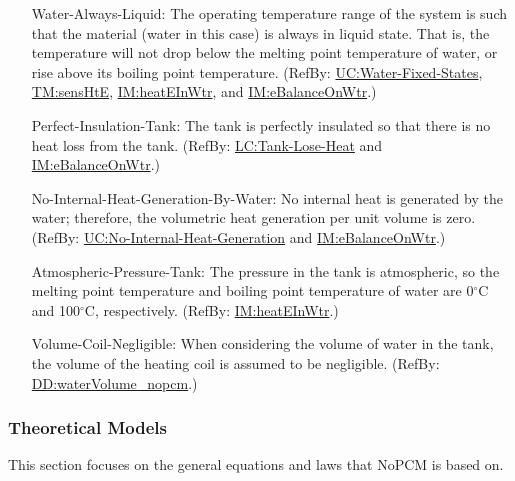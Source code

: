 \documentclass[12pt]{article}
\begin{document}
\begin{itemize}
\item[Water-Always-Liquid:\phantomsection\label{assumpWAL}]{The operating temperature range of the system is such that the material (water in this case) is always in liquid state. That is, the temperature will not drop below the melting point temperature of water, or rise above its boiling point temperature. (RefBy: \hyperref[unlikeChgWFS]{UC:Water-Fixed-States}, \hyperref[TM:sensHtE]{TM:sensHtE}, \hyperref[IM:heatEInWtr]{IM:heatEInWtr}, and \hyperref[IM:eBalanceOnWtr]{IM:eBalanceOnWtr}.)}
\item[Perfect-Insulation-Tank:\phantomsection\label{assumpPIT}]{The tank is perfectly insulated so that there is no heat loss from the tank. (RefBy: \hyperref[likeChgTLH]{LC:Tank-Lose-Heat} and \hyperref[IM:eBalanceOnWtr]{IM:eBalanceOnWtr}.)}
\item[No-Internal-Heat-Generation-By-Water:\phantomsection\label{assumpNIHGBW}]{No internal heat is generated by the water; therefore, the volumetric heat generation per unit volume is zero. (RefBy: \hyperref[unlikeChgNIHG]{UC:No-Internal-Heat-Generation} and \hyperref[IM:eBalanceOnWtr]{IM:eBalanceOnWtr}.)}
\item[Atmospheric-Pressure-Tank:\phantomsection\label{assumpAPT}]{The pressure in the tank is atmospheric, so the melting point temperature and boiling point temperature of water are 0${{}^{\circ}\text{C}}$ and 100${{}^{\circ}\text{C}}$, respectively. (RefBy: \hyperref[IM:heatEInWtr]{IM:heatEInWtr}.)}
\item[Volume-Coil-Negligible:\phantomsection\label{assumpVCN}]{When considering the volume of water in the tank, the volume of the heating coil is assumed to be negligible. (RefBy: \hyperref[DD:waterVolume.nopcm]{DD:waterVolume\_nopcm}.)}
\end{itemize}
\subsubsection{Theoretical Models}
\label{Sec:TMs}
This section focuses on the general equations and laws that NoPCM is based on.
\end{document}
